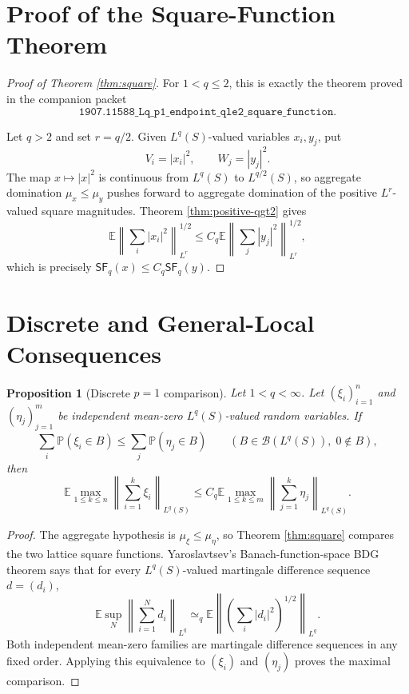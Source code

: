 \documentclass[11pt]{article}
\newtheorem{proposition}{Proposition}
\newcommand{\E}{\mathbb E}
\newcommand{\Pp}{\mathbb P}
\newcommand{\cB}{\mathcal B}
\newcommand{\norm}[1]{\left\lVert #1\right\rVert}
\newcommand{\Lq}{L^q(S)}
\begin{document}
\section*{Proof of the Square-Function Theorem}

\begin{proof}[Proof of Theorem \ref{thm:square}]
For \(1<q\le2\), this is exactly the theorem proved in the companion packet
\[
\texttt{1907.11588\_Lq\_p1\_endpoint\_qle2\_square\_function}.
\]

Let \(q>2\) and set \(r=q/2\).  Given \(L^q(S)\)-valued variables \(x_i,y_j\),
put
\[
  V_i=|x_i|^2,\qquad W_j=|y_j|^2.
\]
The map \(x\mapsto |x|^2\) is continuous from \(L^q(S)\) to \(L^{q/2}(S)\),
so aggregate domination \(\mu_x\le\mu_y\) pushes forward to aggregate
domination of the positive \(L^r\)-valued square magnitudes.  Theorem
\ref{thm:positive-qgt2} gives
\[
  \E\norm{\sum_i |x_i|^2}_{L^r}^{1/2}
  \le
  C_q
  \E\norm{\sum_j |y_j|^2}_{L^r}^{1/2},
\]
which is precisely \(\mathsf{SF}_q(x)\le C_q\mathsf{SF}_q(y)\).
\end{proof}

\section*{Discrete and General-Local Consequences}

\begin{proposition}[Discrete \(p=1\) comparison]
\label{prop:discrete}
Let \(1<q<\infty\).  Let \((\xi_i)_{i=1}^n\) and \((\eta_j)_{j=1}^m\) be
independent mean-zero \(L^q(S)\)-valued random variables.  If
\[
   \sum_i \Pp(\xi_i\in B)
   \le
   \sum_j \Pp(\eta_j\in B)
   \qquad(B\in\cB(\Lq),\;0\notin B),
\]
then
\[
   \E\max_{1\le k\le n}
      \left\|\sum_{i=1}^k \xi_i\right\|_{L^q(S)}
   \le
   C_q
   \E\max_{1\le k\le m}
      \left\|\sum_{j=1}^k \eta_j\right\|_{L^q(S)}.
\]
\end{proposition}

\begin{proof}
The aggregate hypothesis is \(\mu_\xi\le\mu_\eta\), so Theorem
\ref{thm:square} compares the two lattice square functions.  Yaroslavtsev's
Banach-function-space BDG theorem
\cite[Theorem 4.32 and Proposition 4.33]{Yaroslavtsev2018} says that for
every \(L^q(S)\)-valued martingale difference sequence \(d=(d_i)\),
\[
  \E\sup_N\left\|\sum_{i=1}^N d_i\right\|_{L^q}
  \simeq_q
  \E\left\|
      \left(\sum_i |d_i|^2\right)^{1/2}
    \right\|_{L^q}.
\]
Both independent mean-zero families are martingale difference sequences in
any fixed order.  Applying this equivalence to \((\xi_i)\) and \((\eta_j)\)
proves the maximal comparison.
\end{proof}
\end{document}
